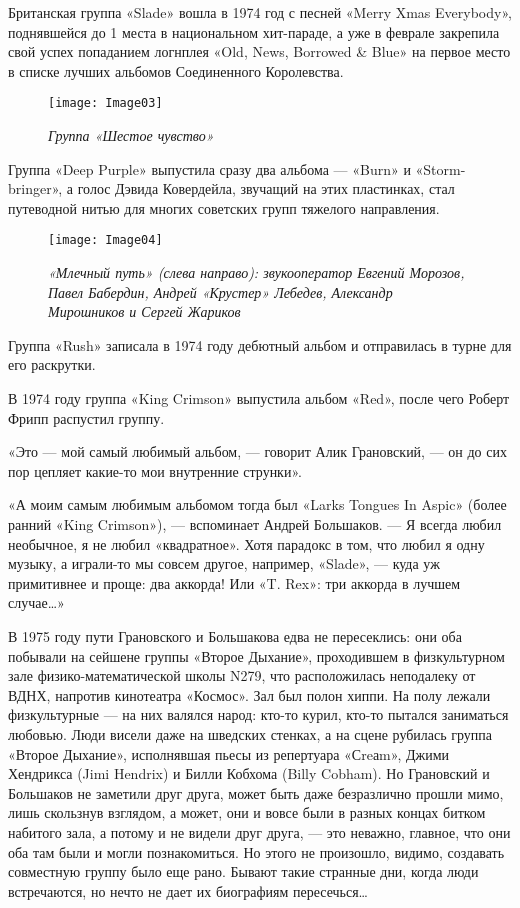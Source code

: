 \documentclass[16pt,a5paper,oneside]{book}
\begin{document}
Британская группа «Slade» вошла в 1974 год с песней «Merry Xmas Everybody», поднявшейся до 1 места в национальном
хит-параде, а уже в феврале закрепила свой успех попаданием логнплея «Old, News, Borrowed \& Blue» на первое место в
списке лучших альбомов Соединенного Королевства.

\begin{wrapfigure}{R}{0.5\textwidth}
    \centering
    \texttt{[image: Image03]}
    \caption{\textit{Группа «Шестое чувство»}}
\end{wrapfigure}

Группа «Deep Purple» выпустила сразу два альбома — «Burn» и «Storm-bringer», а голос Дэвида Ковердейла, звучащий на этих
пластинках, стал путеводной нитью для многих советских групп тяжелого направления.

\begin{figure}
    \centering
    \texttt{[image: Image04]}
    \caption{\textit{
        «Млечный путь» (слева направо): звукооператор Евгений Морозов, Павел Бабердин, Андрей «Крустер» Лебедев,
        Александр Мирошников и Сергей Жариков
    }}
\end{figure}

Группа «Rush» записала в 1974 году дебютный альбом и отправилась в турне для его раскрутки.

В 1974 году группа «King Crimson» выпустила альбом «Red», после чего Роберт Фрипп распустил группу.

«Это — мой самый любимый альбом, — говорит Алик Грановский, — он до сих пор цепляет какие-то мои внутренние струнки».

«А моим самым любимым альбомом тогда был «Larks Tongues In Aspic» (более ранний «King Crimson»), — вспоминает Андрей
Большаков. — Я всегда любил необычное, я не любил «квадратное». Хотя парадокс в том, что любил я одну музыку, а
играли-то мы совсем другое, например, «Slade», — куда уж примитивнее и проще: два аккорда! Или «T. Rex»: три аккорда в
лучшем случае\ldots»

В 1975 году пути Грановского и Большакова едва не пересеклись: они оба побывали на сейшене группы «Второе Дыхание»,
проходившем в физкультурном зале физико-математической школы N279, что расположилась неподалеку от ВДНХ, напротив
кинотеатра «Космос». Зал был полон хиппи. На полу лежали физкультурные — на них валялся народ: кто-то курил, кто-то
пытался заниматься любовью. Люди висели даже на шведских стенках, а на сцене рубилась группа «Второе Дыхание»,
исполнявшая пьесы из репертуара «Сreаm», Джими Хендрикса (Jimi Hendrix) и Билли Кобхома (Billy Cobham). Но Грановский и
Большаков не заметили друг друга, может быть даже безразлично прошли мимо, лишь скользнув взглядом, а может, они и вовсе
были в разных концах битком набитого зала, а потому и не видели друг друга, — это неважно, главное, что они оба там были
и могли познакомиться. Но этого не произошло, видимо, создавать совместную группу было еще рано. Бывают такие странные
дни, когда люди встречаются, но нечто не дает их биографиям пересечься\ldots
\end{document}
